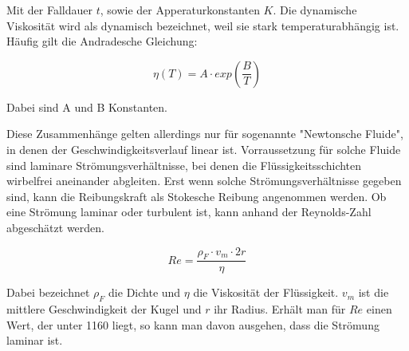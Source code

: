 Mit der Falldauer $t$, sowie der Apperaturkonstanten $K$.
Die dynamische Viskosität wird als dynamisch bezeichnet, weil sie stark 
temperaturabhängig ist. Häufig gilt die Andradesche Gleichung:

\begin{equation}
\eta (T) = A\cdot exp{\left(\frac{B}{T}\right)}
\end{equation}

Dabei sind A und B Konstanten. 

Diese Zusammenhänge gelten allerdings nur für sogenannte "Newtonsche Fluide",
in denen der Geschwindigkeitsverlauf linear ist. Vorraussetzung für solche 
Fluide sind laminare Strömungsverhältnisse, bei denen die Flüssigkeitsschichten
wirbelfrei aneinander abgleiten. Erst wenn solche Strömungsverhältnisse gegeben 
sind, kann die Reibungskraft als Stokesche Reibung angenommen werden. 
Ob eine Strömung laminar oder turbulent ist, kann anhand der Reynolds-Zahl 
abgeschätzt werden. 

\begin{equation}
Re = \frac{\rho _F\cdot v_m\cdot 2r}{\eta}
\label{eqn:Reynolds}
\end{equation}

Dabei bezeichnet $\rho _F$ die Dichte und $\eta$ die Viskosität der Flüssigkeit. 
$v_m$ ist die mittlere Geschwindigkeit der Kugel und $r$ ihr Radius.
Erhält man für $Re$ einen Wert, der unter 1160 liegt, so kann man davon ausgehen, 
dass die Strömung laminar ist. 

